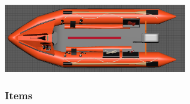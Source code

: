 \documentclass[a4paper, openright, twoside]{book}
\begin{document}
\begin{minipage}{\textwidth}
\hfill \break
\centering
\includegraphics[width=0.6\textwidth]{images/top_model}
\label{model}
\hfill \break
\end{minipage}

\subsubsection{Items}
\end{document}
